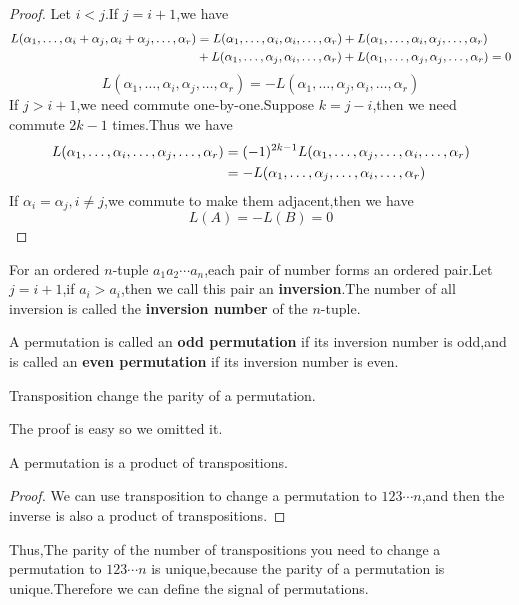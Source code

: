 \documentclass{article}
\begin{document}
\begin{proof}
	Let $i<j$.If $j=i+1$,we have
	\begin{align}
		L(\alpha_1,\dots,\alpha_i+\alpha_j,\alpha_i+\alpha_j,\dots,\alpha_r)&=L(\alpha_1,\dots,\alpha_i,\alpha_i,\dots,\alpha_r)+L(\alpha_1,\dots,\alpha_i,\alpha_j,\dots,\alpha_r)\notag\\
		&+L(\alpha_1,\dots,\alpha_j,\alpha_i,\dots,\alpha_r)+L(\alpha_1,\dots,\alpha_j,\alpha_j,\dots,\alpha_r)=0\notag
	\end{align}
	\[L(\alpha_1,\dots,\alpha_i,\alpha_j,\dots,\alpha_r)=-L(\alpha_1,\dots,\alpha_j,\alpha_i,\dots,\alpha_r)\]
	If $j>i+1$,we need commute one-by-one.Suppose $k=j-i$,then we need commute $2k-1$ times.Thus we have
	\begin{align}
		L(\alpha_1,\dots,\alpha_i,\dots,\alpha_j,\dots,\alpha_r)&=(-1)^{2k-1}L(\alpha_1,\dots,\alpha_j,\dots,\alpha_i,\dots,\alpha_r)\notag\\
		&=-L(\alpha_1,\dots,\alpha_j,\dots,\alpha_i,\dots,\alpha_r)\notag
	\end{align}
	If $\alpha_i=\alpha_j,i\neq j$,we commute to make them adjacent,then we have \[L(A)=-L(B)=0\]
\end{proof}
\begin{dde}
	For an ordered $n$-tuple $a_1a_2\cdots a_n$,each pair of number forms an ordered pair.Let $j=i+1$,if $a_i>a_i$,then we call this pair an \textbf{inversion}.The number of all inversion is called the \textbf{inversion number} of the $n$-tuple.
\end{dde}
\begin{dde}
	A permutation is called an \textbf{odd permutation} if its inversion number is odd,and is called an \textbf{even permutation} if its inversion number is even.
\end{dde}
\begin{thm}
	Transposition change the parity of a permutation.
\end{thm}
The proof is easy so we omitted it.
\begin{thm}
	A permutation is a product of transpositions.
\end{thm}
\begin{proof}
	We can use transposition to change a permutation to $123\cdots n$,and then the inverse is also a product of transpositions. 
\end{proof}
Thus,The parity of the number of transpositions you need to change a permutation to $123\cdots n$ is unique,because the parity of a permutation is unique.Therefore we can define the signal of permutations.
\end{document}
